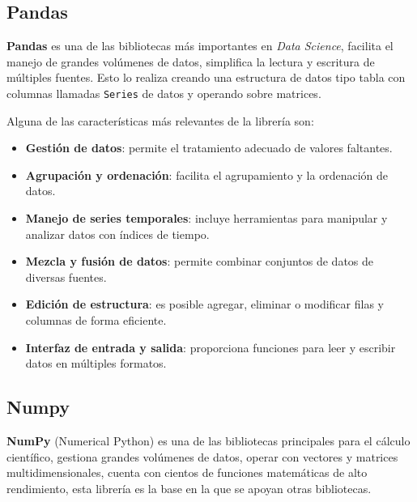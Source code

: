 
\subsection{Pandas}

\textbf{Pandas} es una de las bibliotecas más importantes en \textit{Data Science}, facilita el manejo de grandes volúmenes de datos, simplifica la lectura y escritura de múltiples fuentes. Esto lo realiza creando una estructura de datos tipo tabla con columnas llamadas \texttt{Series} de datos y operando sobre matrices.

Alguna de las características más relevantes de la librería son:

\begin{itemize}
    \item \textbf{Gestión de datos}: permite el tratamiento adecuado de valores faltantes.
    \item \textbf{Agrupación y ordenación}: facilita el agrupamiento y la ordenación de datos.
    \item \textbf{Manejo de series temporales}: incluye herramientas para manipular y analizar datos con índices de tiempo.
    \item \textbf{Mezcla y fusión de datos}: permite combinar conjuntos de datos de diversas fuentes.
    \item \textbf{Edición de estructura}: es posible agregar, eliminar o modificar filas y columnas de forma eficiente.
    \item \textbf{Interfaz de entrada y salida}: proporciona funciones para leer y escribir datos en múltiples formatos.
\end{itemize}

\subsection{Numpy}

\textbf{NumPy} (Numerical Python) es una de las bibliotecas principales para el cálculo científico, gestiona grandes volúmenes de datos, operar con vectores y matrices multidimensionales, cuenta con cientos de funciones matemáticas de alto rendimiento, esta librería es la base en la que se apoyan otras bibliotecas.

